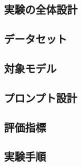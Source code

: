 
\subsection{実験の全体設計}\label{subsec:experiment-design}


\subsection{データセット}\label{subsec:dataset}


\subsection{対象モデル}\label{subsec:models}


\subsection{プロンプト設計}\label{subsec:prompts}


\subsection{評価指標}\label{subsec:metrics}


\subsection{実験手順}\label{subsec:procedure}

